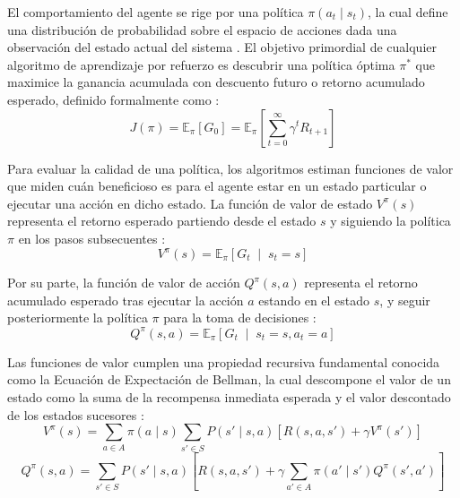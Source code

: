 El comportamiento del agente se rige por una política $\pi(a_t \mid s_t)$, la cual define una distribución de probabilidad sobre el espacio de acciones dada una observación del estado actual del sistema \citep{murphy2025reinforcement}. El objetivo primordial de cualquier algoritmo de aprendizaje por refuerzo es descubrir una política óptima $\pi^*$ que maximice la ganancia acumulada con descuento futuro o retorno acumulado esperado, definido formalmente como \citep{shakya2023reinforcement}:
\begin{equation}
    J(\pi) = \mathbb{E}_{\pi} [G_0] = \mathbb{E}_{\pi} \left[ \sum_{t=0}^{\infty} \gamma^t R_{t+1} \right]
\end{equation}

Para evaluar la calidad de una política, los algoritmos estiman funciones de valor que miden cuán beneficioso es para el agente estar en un estado particular o ejecutar una acción en dicho estado. La función de valor de estado $V^\pi(s)$ representa el retorno esperado partiendo desde el estado $s$ y siguiendo la política $\pi$ en los pasos subsecuentes \citep{shakya2023reinforcement}:
\begin{equation}
    V^\pi(s) = \mathbb{E}_\pi \left[ G_t \;\middle|\; s_t = s \right]
\end{equation}

Por su parte, la función de valor de acción $Q^\pi(s, a)$ representa el retorno acumulado esperado tras ejecutar la acción $a$ estando en el estado $s$, y seguir posteriormente la política $\pi$ para la toma de decisiones \citep{shakya2023reinforcement}:
\begin{equation}
    Q^\pi(s, a) = \mathbb{E}_\pi \left[ G_t \;\middle|\; s_t = s, a_t = a \right]
\end{equation}

Las funciones de valor cumplen una propiedad recursiva fundamental conocida como la Ecuación de Expectación de Bellman, la cual descompone el valor de un estado como la suma de la recompensa inmediata esperada y el valor descontado de los estados sucesores \citep{murphy2025reinforcement}:
\begin{equation}
    V^\pi(s) = \sum_{a \in A} \pi(a \mid s) \sum_{s' \in S} P(s' \mid s, a) \left[ R(s, a, s') + \gamma V^\pi(s') \right]
\end{equation}
\begin{equation}
    Q^\pi(s, a) = \sum_{s' \in S} P(s' \mid s, a) \left[ R(s, a, s') + \gamma \sum_{a' \in A} \pi(a' \mid s') Q^\pi(s', a') \right]
\end{equation}

